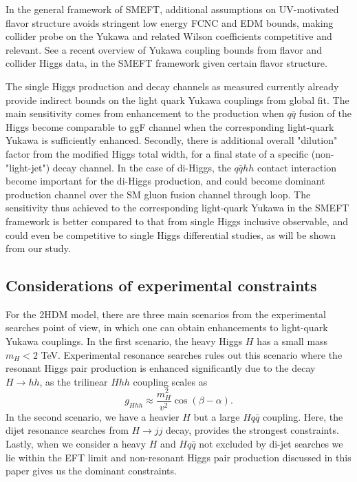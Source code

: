 In the general framework of SMEFT, additional assumptions on UV-motivated flavor structure avoids stringent low energy FCNC and EDM bounds, making collider probe on the Yukawa and related Wilson coefficients competitive and relevant. See a recent overview of Yukawa coupling bounds from flavor and collider Higgs data, in the SMEFT framework given certain flavor structure. \cite{Alonso-Gonzalez:2021tpo}

The single Higgs production and decay channels as measured currently already provide indirect bounds on the light quark Yukawa couplings from global fit. The main sensitivity comes from enhancement to the production when $q\bar q$ fusion of the Higgs become comparable to ggF channel when the corresponding light-quark Yukawa is sufficiently enhanced. Secondly, there is additional overall "dilution" factor from the modified Higgs total width, for a final state of a specific (non-"light-jet") decay channel.
In the case of di-Higgs, the $q\bar q hh$ contact interaction become important for the di-Higgs production, and could become dominant production channel over the SM gluon fusion channel through loop. The sensitivity thus achieved to the corresponding light-quark Yukawa in the SMEFT framework is better compared to that from single Higgs inclusive observable, and could even be competitive to single Higgs differential studies, as will be shown from our study.


\subsection{Considerations of experimental constraints}
For the 2HDM model, there are three main scenarios from the experimental searches point of view, in which one can obtain enhancements to light-quark Yukawa couplings. In the first scenario, the heavy Higgs $H$ has a small mass~$m_H <2$ TeV. Experimental resonance searches rules out this scenario where the resonant Higgs pair production is enhanced significantly due to the decay~$ H\to hh$, as the trilinear $Hhh$ coupling scales as~\cite{Egana-Ugrinovic:2021uew}
\begin{equation}
	g_{Hhh}\approx \frac{m_H^2}{v^2} \cos(\beta-\alpha).
\end{equation}
In the second scenario, we have a heavier $H$ but a large $Hq\bar{q}$ coupling. Here, the dijet resonance searches from $H\to jj$ decay, provides the strongest constraints. Lastly, when we consider a heavy $H$ and $Hq\bar{q}$  not excluded by di-jet searches we lie within the EFT limit and non-resonant Higgs pair production discussed in this paper gives us the dominant constraints.

